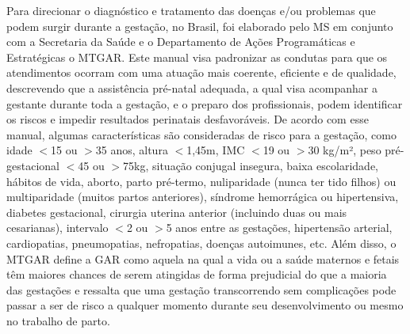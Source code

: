 Para direcionar o diagnóstico e tratamento das doenças e/ou problemas que podem surgir durante a gestação, no Brasil, foi elaborado pelo \ac{MS} em conjunto com a Secretaria da Saúde e o Departamento de Ações Programáticas e Estratégicas o \ac{MTGAR}. Este manual visa padronizar as condutas  para que os atendimentos ocorram com uma atuação mais coerente, eficiente e de qualidade, descrevendo que a assistência pré-natal adequada, a qual visa acompanhar a gestante durante toda a gestação, e o preparo dos profissionais, podem identificar os riscos e impedir resultados perinatais desfavoráveis. De acordo com esse manual, algumas características são consideradas de risco para a gestação, como idade $<$15 ou $>$35 anos, altura $<$1,45m, \ac{IMC} $<$19 ou $>$30 kg/m², peso pré-gestacional $<$45 ou $>$75kg, situação conjugal insegura, baixa escolaridade, hábitos de vida, aborto, parto pré-termo, nuliparidade (nunca ter tido filhos) ou multiparidade (muitos partos anteriores), síndrome hemorrágica ou hipertensiva, diabetes gestacional, cirurgia uterina anterior (incluindo duas ou mais cesarianas), intervalo $<$2 ou $>$5 anos entre as gestações, hipertensão arterial, cardiopatias, pneumopatias, nefropatias, doenças autoimunes, etc. Além disso, o \ac{MTGAR} define a \ac{GAR} como aquela na qual a vida ou a saúde maternos e fetais têm maiores chances de serem atingidas de forma prejudicial do que a maioria das gestações e ressalta que uma gestação transcorrendo sem complicações pode passar a ser de risco a qualquer momento durante seu desenvolvimento ou mesmo no trabalho de parto.


